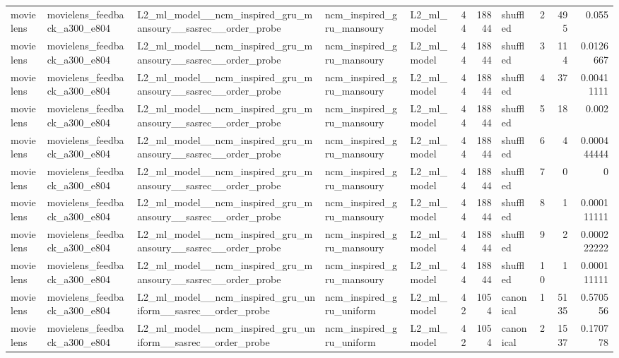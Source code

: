 \begin{table}[htbp!]
\begin{tabular}{lllllrrlrrr}
movielens & movielens\_feedback\_a300\_e804 & L2\_ml\_model\_\_ncm\_inspired\_gru\_mansoury\_\_sasrec\_\_order\_probe & ncm\_inspired\_gru\_mansoury & L2\_ml\_model & 44 & 18844 & shuffled & 2 & 495 & 0.055 \\
movielens & movielens\_feedback\_a300\_e804 & L2\_ml\_model\_\_ncm\_inspired\_gru\_mansoury\_\_sasrec\_\_order\_probe & ncm\_inspired\_gru\_mansoury & L2\_ml\_model & 44 & 18844 & shuffled & 3 & 114 & 0.0126667 \\
movielens & movielens\_feedback\_a300\_e804 & L2\_ml\_model\_\_ncm\_inspired\_gru\_mansoury\_\_sasrec\_\_order\_probe & ncm\_inspired\_gru\_mansoury & L2\_ml\_model & 44 & 18844 & shuffled & 4 & 37 & 0.00411111 \\
movielens & movielens\_feedback\_a300\_e804 & L2\_ml\_model\_\_ncm\_inspired\_gru\_mansoury\_\_sasrec\_\_order\_probe & ncm\_inspired\_gru\_mansoury & L2\_ml\_model & 44 & 18844 & shuffled & 5 & 18 & 0.002 \\
movielens & movielens\_feedback\_a300\_e804 & L2\_ml\_model\_\_ncm\_inspired\_gru\_mansoury\_\_sasrec\_\_order\_probe & ncm\_inspired\_gru\_mansoury & L2\_ml\_model & 44 & 18844 & shuffled & 6 & 4 & 0.000444444 \\
movielens & movielens\_feedback\_a300\_e804 & L2\_ml\_model\_\_ncm\_inspired\_gru\_mansoury\_\_sasrec\_\_order\_probe & ncm\_inspired\_gru\_mansoury & L2\_ml\_model & 44 & 18844 & shuffled & 7 & 0 & 0 \\
movielens & movielens\_feedback\_a300\_e804 & L2\_ml\_model\_\_ncm\_inspired\_gru\_mansoury\_\_sasrec\_\_order\_probe & ncm\_inspired\_gru\_mansoury & L2\_ml\_model & 44 & 18844 & shuffled & 8 & 1 & 0.000111111 \\
movielens & movielens\_feedback\_a300\_e804 & L2\_ml\_model\_\_ncm\_inspired\_gru\_mansoury\_\_sasrec\_\_order\_probe & ncm\_inspired\_gru\_mansoury & L2\_ml\_model & 44 & 18844 & shuffled & 9 & 2 & 0.000222222 \\
movielens & movielens\_feedback\_a300\_e804 & L2\_ml\_model\_\_ncm\_inspired\_gru\_mansoury\_\_sasrec\_\_order\_probe & ncm\_inspired\_gru\_mansoury & L2\_ml\_model & 44 & 18844 & shuffled & 10 & 1 & 0.000111111 \\
movielens & movielens\_feedback\_a300\_e804 & L2\_ml\_model\_\_ncm\_inspired\_gru\_uniform\_\_sasrec\_\_order\_probe & ncm\_inspired\_gru\_uniform & L2\_ml\_model & 42 & 1054 & canonical & 1 & 5135 & 0.570556 \\
movielens & movielens\_feedback\_a300\_e804 & L2\_ml\_model\_\_ncm\_inspired\_gru\_uniform\_\_sasrec\_\_order\_probe & ncm\_inspired\_gru\_uniform & L2\_ml\_model & 42 & 1054 & canonical & 2 & 1537 & 0.170778 \\

\end{tabular}
\end{table}
